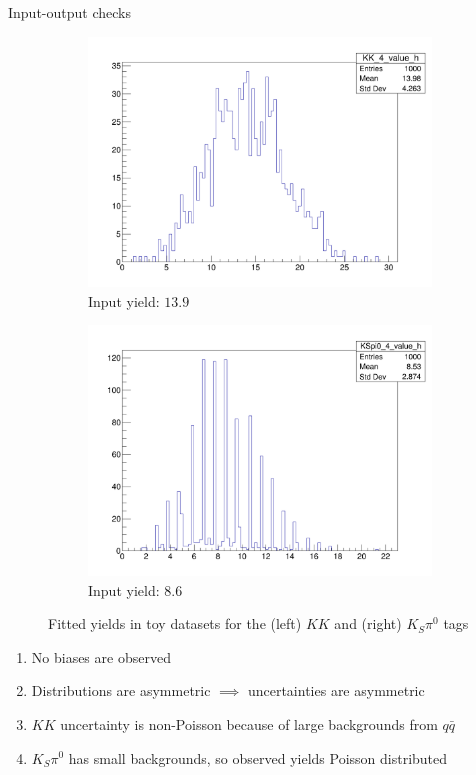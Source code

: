 \documentclass{beamer}
\begin{document}
\begin{frame}{Input-output checks}
  \begin{figure}
    \centering
    \begin{subfigure}{0.5\textwidth}
      \centering
      \includegraphics[width=1.0\textwidth]{Plots/KK_ToyYields_Bin4.png}
      \caption{Input yield: $13.9$}
    \end{subfigure}%
    \begin{subfigure}{0.5\textwidth}
      \centering
      \includegraphics[width=1.0\textwidth]{Plots/KSpi0_ToyYields_Bin4.png}
      \caption{Input yield: $8.6$}
    \end{subfigure}
    \caption{Fitted yields in toy datasets for the (left) $KK$ and (right) $K_S\pi^0$ tags}
  \end{figure}
  \vspace{-0.4cm}
  \begin{enumerate}
    \item{No biases are observed}
    \item{Distributions are asymmetric $\implies$ uncertainties are asymmetric}
    \item{$KK$ uncertainty is non-Poisson because of large backgrounds from $q\bar{q}$}
    \item{$K_S\pi^0$ has small backgrounds, so observed yields Poisson distributed}
  \end{enumerate}
\end{frame}
\end{document}

